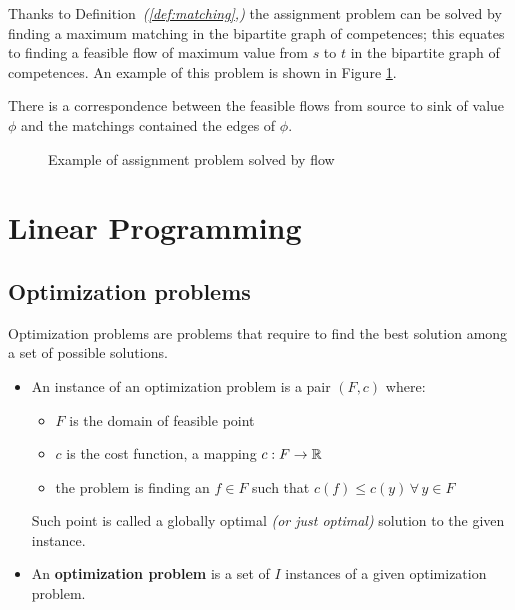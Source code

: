 \documentclass[english]{article}
\begin{document}
Thanks to Definition~\textit{(\ref{def:matching},)} the assignment problem can be solved by finding a maximum matching in the bipartite graph of competences;
this equates to finding a feasible flow of maximum value from \(s\) to \(t\) in the bipartite graph of competences.
An example of this problem is shown in Figure \ref{fig:assignment-flow-example}.

There is a correspondence between the feasible flows from source to sink of value \(\phi\) and the matchings contained the edges of \(\phi\).

\begin{figure}[htbp]
  \bigskip
  \centering
  \caption{Example of assignment problem solved by flow}
  \label{fig:assignment-flow-example}
  \bigskip
\end{figure}

\clearpage

\section{Linear Programming}
\label{sec:linear-programming}

\subsection{Optimization problems}

Optimization problems are problems that require to find the best solution among a set of possible solutions.

\begin{itemize}
  \item An instance of an optimization problem is a pair \(\left( F, c \right)\) where:
        \begin{itemize}
          \item \(F\) is the domain of feasible point
          \item \(c\) is the cost function, a mapping \(c :  F \rightarrow \mathbb{R}\)
          \item the problem is finding an \(f \in F\) such that \(c\left( f \right) \leq c\left( y \right) \, \forall \, y \in F\)
        \end{itemize}
        Such point is called a globally optimal \textit{(or just optimal)} solution to the given instance.

  \item An \textbf{optimization problem} is a set of \(I\) instances of a given optimization problem.
\end{itemize}
\end{document}
